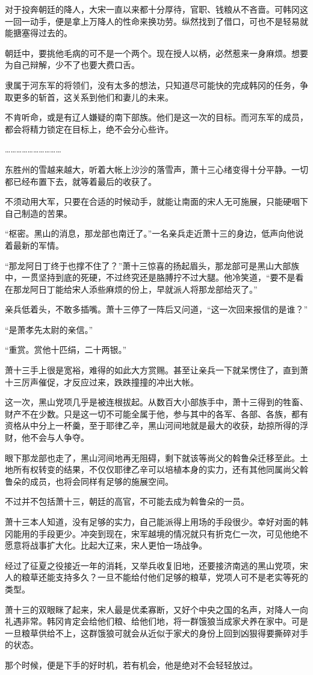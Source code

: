 对于投奔朝廷的降人，大宋一直以来都十分厚待，官职、钱粮从不吝啬。可韩冈这一回一动手，便是拿上万降人的性命来换功劳。纵然找到了借口，可也不是轻易就能搪塞得过去的。

朝廷中，要挑他毛病的可不是一个两个。现在授人以柄，必然惹来一身麻烦。想要为自己辩解，少不了也要大费口舌。

隶属于河东军的将领们，没有太多的想法，只知道尽可能快的完成韩冈的任务，争取更多的斩首，这关系到他们和妻儿的未来。

不肯听命，或是有辽人嫌疑的南下部族。他们是这一次的目标。而河东军的成员，都会将精力锁定在目标上，绝不会分心些许。

…………………………

东胜州的雪越来越大，听着大帐上沙沙的落雪声，萧十三心绪变得十分平静。一切都已经布置下去，就等着最后的收获了。

不须动用大军，只要在合适的时候动手，就能让南面的宋人无可施展，只能硬咽下自己制造的苦果。

“枢密。黑山的消息，那龙部也南迁了。”一名亲兵走近萧十三的身边，低声向他说着最新的军情。

“那龙阿日丁终于也撑不住了？”萧十三惊喜的扬起眉头，那龙部可是黑山大部族中，一贯坚持到底的死硬，不过终究还是胳膊拧不过大腿。他冷笑道，“要不是看在那龙阿日丁能给宋人添些麻烦的份上，早就派人将那龙部给灭了。”

亲兵低着头，不敢多插嘴。萧十三停了一阵后又问道，“这一次回来报信的是谁？”

“是萧孝先太尉的亲信。”

“重赏。赏他十匹绢，二十两银。”

萧十三手上很是宽裕，难得的如此大方赏赐。甚至让亲兵一下就呆愣住了，直到萧十三厉声催促，才反应过来，跌跌撞撞的冲出大帐。

这一次，黑山党项几乎是被连根拔起。从数百大小部族手中，萧十三得到的牲畜、财产不在少数。只是这一切不可能全属于他，参与其中的各军、各部、各族，都有资格从中分上一杯羹，至于耶律乙辛，黑山河间地就是最大的收获，劫掠所得的浮财，他不会与人争夺。

眼下那龙部也走了，黑山河间地再无阻碍，剩下就该等尚父的斡鲁朵迁移至此。土地所有权转变的结果，不仅仅耶律乙辛可以培植本身的实力，还有其他同属尚父斡鲁朵的成员，也将会同样有足够的施展空间。

不过并不包括萧十三，朝廷的高官，不可能去成为斡鲁朵的一员。

萧十三本人知道，没有足够的实力，自己能派得上用场的手段很少。幸好对面的韩冈能用的手段更少。冲突到现在，宋军越境的情况就只有折克仁一次，可见他绝不愿意将战事扩大化。比起大辽来，宋人更怕一场战争。

经过了征夏之役接近一年的消耗，又举兵收复旧地，还要接济南逃的黑山党项，宋人的粮草还能支持多久？一旦不能给付他们足够的粮草，党项人可不是老实等死的类型。

萧十三的双眼眯了起来，宋人最是优柔寡断，又好个中央之国的名声，对降人一向礼遇非常。韩冈肯定会给他们粮、给他们地，将一群饿狼当成家犬养在家中。可是一旦粮草供给不上，这群饿狼可就会从近似于家犬的身份上回到凶狠得要撕碎对手的状态。

那个时候，便是下手的好时机，若有机会，他是绝对不会轻轻放过。

